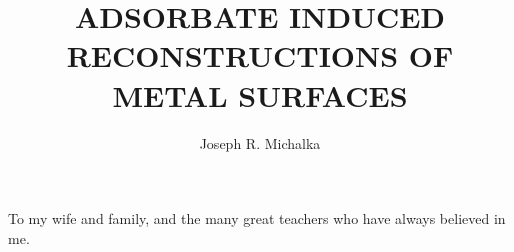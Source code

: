 \documentclass[final, numrefs]{nddiss2e}
\begin{document}
\frontmatter         %

\title{ADSORBATE INDUCED RECONSTRUCTIONS OF METAL SURFACES}            %
\author{Joseph R. Michalka}           %

\maketitle           %





\renewcommand{\dedicationname}{DEDICATION} %
\begin{dedication}
To my wife and family, and the many great teachers who have always believed in me.
\end{dedication}
\end{document}
